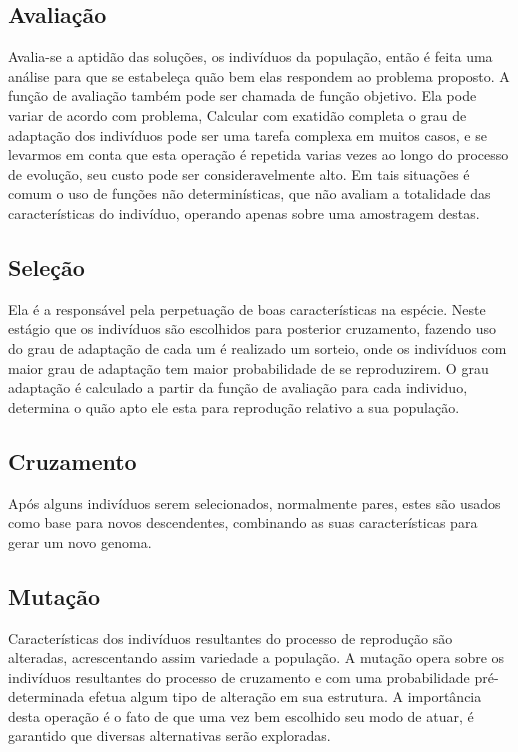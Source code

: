 \subsection{Avaliação}
Avalia-se a aptidão das soluções, os indivíduos da população, então é feita uma análise para que se estabeleça quão bem elas respondem ao problema proposto.
A função de avaliação também pode ser chamada de função objetivo. Ela pode variar de acordo com problema,  
Calcular com exatidão completa o grau de adaptação dos indivíduos pode ser uma tarefa complexa em muitos casos, e se levarmos em conta que esta operação é repetida varias vezes ao longo do processo de evolução, seu custo pode ser consideravelmente alto. Em tais situações é comum o uso de funções não determinísticas, que não avaliam a totalidade das características do indivíduo, operando apenas sobre uma amostragem destas.

\subsection{Seleção}
Ela é a responsável pela perpetuação de boas características na espécie. 
Neste estágio que os indivíduos são escolhidos para posterior cruzamento, fazendo uso do grau de adaptação de cada um é realizado um sorteio, onde os indivíduos com maior grau de adaptação tem maior probabilidade de se reproduzirem.
O grau adaptação é calculado a partir da função de avaliação para cada individuo, determina o quão apto ele esta para reprodução relativo a sua população. 


\subsection{Cruzamento}
Após alguns indivíduos serem selecionados, normalmente pares, estes são usados como base para novos descendentes, combinando as suas características para gerar um novo genoma.

\subsection{Mutação}
Características dos indivíduos resultantes do processo de reprodução são alteradas, acrescentando assim variedade a população.
A mutação opera sobre os indivíduos resultantes do processo de cruzamento e com uma probabilidade pré-determinada efetua algum tipo de alteração em sua  estrutura. A importância desta operação é o fato de que uma vez bem escolhido seu modo de atuar, é garantido que diversas alternativas serão exploradas.


